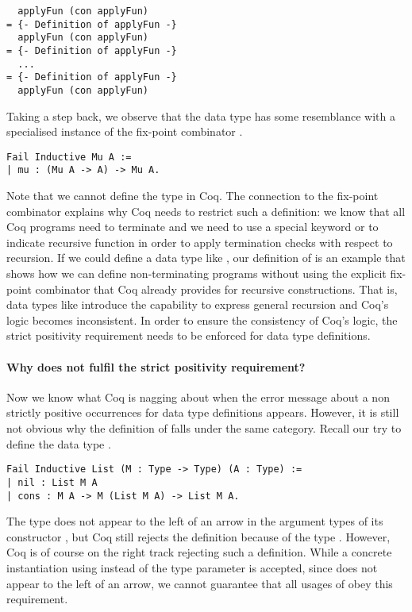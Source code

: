 \begin{verbatim}
  applyFun (con applyFun)
= {- Definition of applyFun -}
  applyFun (con applyFun)
= {- Definition of applyFun -}
  ...
= {- Definition of applyFun -}
  applyFun (con applyFun)
\end{verbatim}

Taking a step back, we observe that the data type
 has some resemblance with a specialised instance
of the fix-point combinator .

\begin{verbatim}
Fail Inductive Mu A :=
| mu : (Mu A -> A) -> Mu A.
\end{verbatim}

Note that we cannot define the type  in Coq.
The connection to the fix-point combinator explains why Coq needs to
restrict such a definition: we know that all Coq programs need to
terminate and we need to use a special keyword  or
 to indicate recursive function in order to apply
termination checks with respect to recursion.
If we could define a data type like , our definition of
 is an example that shows how we can define
non-terminating programs without using the explicit fix-point
combinator that Coq already provides for recursive constructions.
That is, data types like  introduce the capability to express
general recursion and Coq's logic becomes inconsistent.
In order to ensure the consistency of Coq's logic, the strict
positivity requirement needs to be enforced for data type definitions.

\paragraph{Why does  not fulfil the strict positivity requirement?}

Now we know what Coq is nagging about when the error message about a
non strictly positive occurrences for data type definitions appears.
However, it is still not obvious why the definition of 
falls under the same category.
Recall our try to define the data type .

\begin{verbatim}
Fail Inductive List (M : Type -> Type) (A : Type) :=
| nil : List M A
| cons : M A -> M (List M A) -> List M A.
\end{verbatim}

The type  does not appear to the left of an arrow in the
argument types of its constructor , but Coq still rejects
the definition because of the type .
However, Coq is of course on the right track rejecting such a
definition.
While a concrete instantiation using  instead of the
type parameter  is accepted, since  does not appear
to the left of an arrow, we cannot guarantee that all usages of
 obey this requirement.

